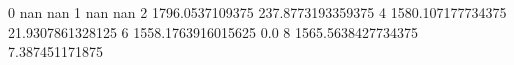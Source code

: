 0 nan nan
1 nan nan
2 1796.0537109375 237.8773193359375
4 1580.107177734375 21.9307861328125
6 1558.1763916015625 0.0
8 1565.5638427734375 7.387451171875

